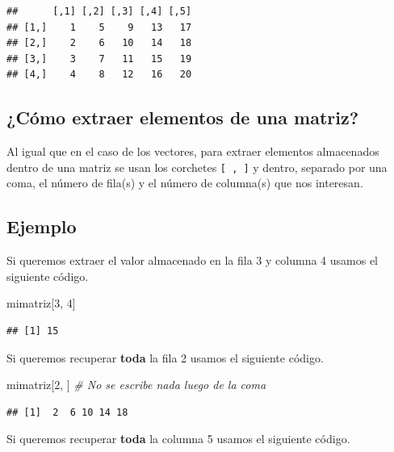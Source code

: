 \documentclass[
]{book}
\makeatletter
\newenvironment{Shaded}{\begin{snugshade}}{\end{snugshade}}
\newcommand{\CommentTok}[1]{\textcolor[rgb]{0.56,0.35,0.01}{\textit{#1}}}
\newcommand{\DecValTok}[1]{\textcolor[rgb]{0.00,0.00,0.81}{#1}}
\newcommand{\NormalTok}[1]{#1}
\newenvironment{kframe}{%
\medskip{}
\setlength{\fboxsep}{.8em}
 \def\at@end@of@kframe{}%
 \ifinner\ifhmode%
  \def\at@end@of@kframe{\end{minipage}}%
  \begin{minipage}{\columnwidth}%
 \fi\fi%
 \def\FrameCommand##1{\hskip\@totalleftmargin \hskip-\fboxsep
 \colorbox{shadecolor}{##1}\hskip-\fboxsep
     \hskip-\linewidth \hskip-\@totalleftmargin \hskip\columnwidth}%
 \MakeFramed {\advance\hsize-\width
   \@totalleftmargin\z@ \linewidth\hsize
   \@setminipage}}%
 {\par\unskip\endMakeFramed%
 \at@end@of@kframe}
\renewenvironment{Shaded}{\begin{kframe}}{\end{kframe}}
\makeatother
\begin{document}
\begin{verbatim}
##      [,1] [,2] [,3] [,4] [,5]
## [1,]    1    5    9   13   17
## [2,]    2    6   10   14   18
## [3,]    3    7   11   15   19
## [4,]    4    8   12   16   20
\end{verbatim}

\hypertarget{cuxf3mo-extraer-elementos-de-una-matriz}{%
\subsection{¿Cómo extraer elementos de una matriz?}\label{cuxf3mo-extraer-elementos-de-una-matriz}}

Al igual que en el caso de los vectores, para extraer elementos almacenados dentro de una matriz se usan los corchetes \texttt{{[}\ ,\ {]}} y dentro, separado por una coma, el número de fila(s) y el número de columna(s) que nos interesan.

\hypertarget{ejemplo-1}{%
\subsection*{Ejemplo}\label{ejemplo-1}}

Si queremos extraer el valor almacenado en la fila 3 y columna 4 usamos el siguiente código.

\begin{Shaded}
\begin{Highlighting}[]
\NormalTok{mimatriz[}\DecValTok{3}\NormalTok{, }\DecValTok{4}\NormalTok{]}
\end{Highlighting}
\end{Shaded}

\begin{verbatim}
## [1] 15
\end{verbatim}

Si queremos recuperar \textbf{toda} la fila 2 usamos el siguiente código.

\begin{Shaded}
\begin{Highlighting}[]
\NormalTok{mimatriz[}\DecValTok{2}\NormalTok{, ]  }\CommentTok{\# No se escribe nada luego de la coma}
\end{Highlighting}
\end{Shaded}

\begin{verbatim}
## [1]  2  6 10 14 18
\end{verbatim}

Si queremos recuperar \textbf{toda} la columna 5 usamos el siguiente código.
\end{document}
